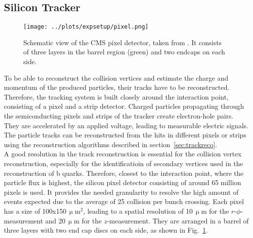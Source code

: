 \subsection*{Silicon Tracker}
\begin{figure}
	\centering
	\texttt{[image: ../plots/expsetup/pixel.png]}
	\caption[Schematic view of the CMS pixel detector]{Schematic view of the CMS pixel detector, taken from \cite{CMS_design}. It consists of three layers in the barrel region (green) and two endcaps on each side.}
	\label{fig:expsetup:pixel}
\end{figure}
To be able to reconstruct the collision vertices and estimate the charge and momentum of the produced particles, their tracks have to be reconstructed. Therefore, the tracking system is built closely around the interaction point, consisting of a pixel and a strip detector. Charged particles propagating through the semiconducting pixels and strips of the tracker create electron-hole pairs. They are accelerated by an applied voltage, leading to measurable electric signals. The particle tracks can be reconstructed from the hits in different pixels or strips using the reconstruction algorithms described in section~\ref{sec:trackreco}.\\

\noindent A good resolution in the track reconstruction is essential for the collision vertex reconstruction, especially for the identificatioin of secondary vertices used in the reconstruction of b quarks. Therefore, closest to the interaction point, where the particle flux is highest, the silicon pixel detector consisting of around 65 million pixels is used. It provides the needed granularity to resolve the high amount of events expected due to the average of 25 collision per bunch crossing. Each pixel has a size of 100x150\,$\upmu$m$^2$, leading to a spatial resolution of 10\,$\upmu$m for the $r$-$\phi$-measurement and 20\,$\upmu$m for the $z$-measurement. They are arranged in a barrel of three layers with two end cap discs on each side, as shown in Fig.~\ref{fig:expsetup:pixel}.\\

